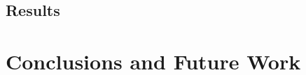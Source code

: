 \subsection{Results}
\label{subsec:results}

\section{Conclusions and Future Work}
\label{sec:discussion_conclusion}




